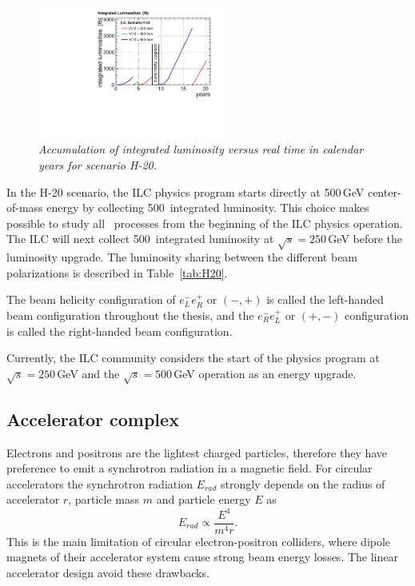 \begin{figure}
	{\centering
		\includegraphics[width=0.55\textwidth]{graphics/lumi_H-20.pdf}
		\caption{\sl Accumulation of integrated luminosity versus real time in calendar years for scenario H-20.}
		\label{fig:H20}
	}
\end{figure}
In the H-20 scenario, the ILC physics program starts directly at 500\,GeV center-of-mass energy by collecting 500\ifb\ integrated luminosity. This choice makes possible to study all \sm\ processes from the beginning of the ILC physics operation.
The ILC will next collect 500\ifb\ integrated luminosity at $\sqrt{s} = 250$\,GeV before the luminosity upgrade.
The luminosity sharing between the different beam polarizations is described in Table~\ref{tab:H20}. 



The beam helicity configuration of $e^-_Le^+_R$ or $(-,+)$ is called the left-handed beam configuration throughout the thesis, and the $e^-_Re^+_L$ or $(+,-)$ configuration is called the right-handed beam configuration. 

Currently, the ILC community considers the start of the physics program at $\sqrt{s} = 250$\,GeV and  the $\sqrt{s} = 500$\,GeV operation as an energy upgrade.


\subsection{Accelerator complex}
\label{sec:ILCacc}
Electrons and positrons are the lightest charged particles, therefore they have preference to emit a synchrotron radiation in a magnetic field. For circular accelerators the synchrotron radiation $E_{rad}$ strongly depends on the radius of accelerator $r$, particle mass $m$ and particle energy $E$ as
\begin{equation}
	E_{rad} \propto \frac{E^4}{m^4r}.
\end{equation}
This is the main limitation of circular electron-positron colliders, where dipole magnets of their accelerator system cause strong beam energy losses. 
The linear accelerator design avoid these drawbacks.

